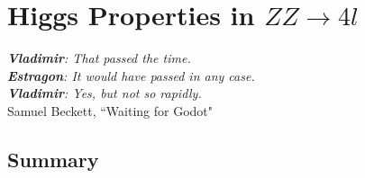 \chapter{Higgs Properties in $ZZ\rightarrow4l$}
\label{sec:properties}

\begin{center}
\begin{footnotesize}
\textit{\textbf{Vladimir}: That passed the time.\\
\textbf{Estragon}: It would have passed in any case.\\
\textbf{Vladimir}: Yes, but not so rapidly.}\\
Samuel Beckett, ``Waiting for Godot"
\end{footnotesize}
\end{center}

\section{Summary}
\label{sec:properties_summary}